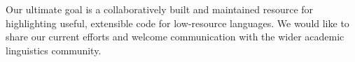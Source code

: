 \documentclass[10pt, a4paper]{article}
\begin{document}
Our ultimate goal is a collaboratively built and maintained resource for highlighting
useful, extensible code for low-resource languages. We would like to share our current efforts
and welcome communication with the wider academic linguistics community.





%
%
%
%
%
%
%
\end{document}
